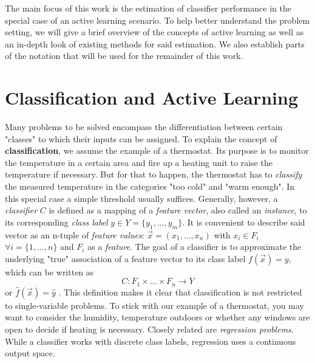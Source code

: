 \label{background}


The main focus of this work is the estimation of classifier performance in the special case of an active learning scenario. To help better understand the problem setting, we will give a brief overview of the concepts of active learning as well as an in-depth look of existing methods for said estimation. We also establish parts of the notation that will be used for the remainder of this work.

\section{Classification and Active Learning}
Many problems to be solved encompass the differentiation between certain "classes" to which their inputs can be assigned. To explain the concept of \textbf{classification}, we assume the example of a thermostat. Its purpose is to monitor the temperature in a certain area and fire up a heating unit to raise the temperature if necessary. But for that to happen, the thermostat has to \textit{classify} the measured temperature in the categories "too cold" and "warm enough". In this special case a simple threshold usually suffices. Generally, however, a \textit{classifier} $C$ is defined as a mapping of a \textit{feature vector}, also called an \textit{instance}, to its corresponding \textit{class label} $y \in Y = \{y_1, ..., y_m\}$. It is convenient to describe said vector as an n-tuple of \textit{feature values}: $\vec{x} = (x_1, ..., x_n)$ with $x_i \in F_i$ $\forall i=\{1,...,n\}$ and $F_i$ as a \textit{feature}. The goal of a classifier is to approximate the underlying "true" association of a feature vector to its class label $f(\vec{x}) = y$, which can be written as
\begin{equation}
C: F_1 \times ... \times F_n \rightarrow Y
\end{equation}
or $\hat{f}(\vec{x}) = \hat{y}$ \cite{RodriguezEtAl2013}. This definition makes it clear that classification is not restricted to single-variable problems. To stick with our example of a thermostat, you may want to consider the humidity, temperature outdoors or whether any windows are open to decide if heating is necessary. Closely related are \textit{regression problems}. While a classifier works with discrete class labels, regression uses a continuous output space.

